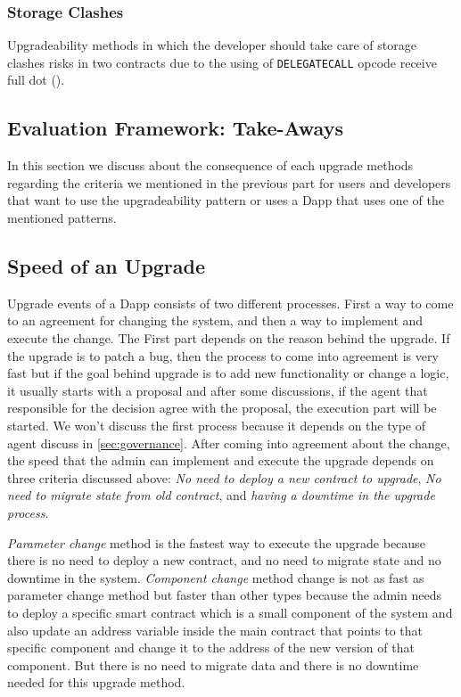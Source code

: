 \subsubsection{Storage Clashes}
Upgradeability methods in which the developer should take care of storage clashes risks in two contracts due to the using of \texttt{DELEGATECALL} opcode receive full dot (\full). 




\subsection{Evaluation Framework: Take-Aways}
\label{app:eval2}

In this section we discuss about the consequence of each upgrade methods regarding the criteria we mentioned in the previous part for users and developers that want to use the upgradeability pattern or uses a Dapp that uses one of the mentioned patterns.

\subsection{Speed of an Upgrade}
Upgrade events of a Dapp consists of two different processes. First a way to come to an agreement for changing the system, and then a way to implement and execute the change. The First part depends on the reason behind the upgrade. If the upgrade is to patch a bug, then the process to come into agreement is very fast but if the goal behind upgrade is to add new functionality or change a logic, it usually starts with a proposal and after some discussions, if the agent that responsible for the decision agree with the proposal, the execution part will be started. We won't discuss the first process because it depends on the type of agent discuss in \ref{sec:governance}.
After coming into agreement about the change, the speed that the admin can implement and execute the upgrade depends on three criteria discussed above: \textit{No need to deploy a new contract to upgrade}, \textit{No need to migrate state from old contract}, and \textit{having a downtime in the upgrade process}.

\textit{Parameter change} method is the fastest way to execute the upgrade because there is no need to deploy a new contract, and no need to migrate state and no downtime in the system.
\textit{Component change} method change is not as fast as parameter change method but faster than other types because the admin needs to deploy a specific smart contract which is a small component of the system and also update an address variable inside the main contract that points to that specific component and change it to the address of the new version of that component. But there is no need to migrate data and there is no downtime needed for this upgrade method.

